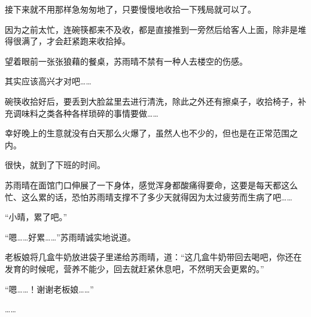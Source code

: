 接下来就不用那样急匆匆地了，只要慢慢地收拾一下残局就可以了。

因为之前太忙，连碗筷都来不及收，都是直接推到一旁然后给客人上面，除非是堆得很满了，才会赶紧跑来收拾掉。

望着眼前一张张狼藉的餐桌，苏雨晴不禁有一种人去楼空的伤感。

其实应该高兴才对吧……

碗筷收拾好后，要丢到大脸盆里去进行清洗，除此之外还有擦桌子，收拾椅子，补充调味料之类各种各样琐碎的事情要做……

幸好晚上的生意就没有白天那么火爆了，虽然人也不少的，但也是在正常范围之内。

很快，就到了下班的时间。

苏雨晴在面馆门口伸展了一下身体，感觉浑身都酸痛得要命，这要是每天都这么忙、这么累的话，恐怕苏雨晴支撑不了多少天就得因为太过疲劳而生病了吧……

“小晴，累了吧。”

“嗯……好累……”苏雨晴诚实地说道。

老板娘将几盒牛奶放进袋子里递给苏雨晴，道：“这几盒牛奶带回去喝吧，你还在发育的时候呢，营养不能少，回去就赶紧休息吧，不然明天会更累的。”

“嗯……！谢谢老板娘……”

……
